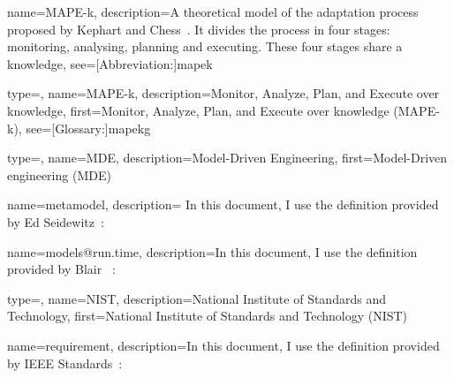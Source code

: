 {
	name={MAPE-k},
    description={A theoretical model of the adaptation process proposed by Kephart and Chess~\cite{DBLP:journals/computer/KephartC03}. It divides the process in four stages: monitoring, analysing, planning and executing. These four stages share a \gls{knowledge}},
    see=[Abbreviation:]{mapek}
}

{
	type=\acronymtype, 
	name={MAPE-k}, 
	description={Monitor, Analyze, Plan, and Execute over knowledge}, 
	first={Monitor, Analyze, Plan, and Execute over knowledge (MAPE-k)}, 
	see=[Glossary:]{mapekg}
}

{
	type=\acronymtype, 
	name={MDE},
	description={Model-Driven Engineering},
	first={Model-Driven engineering (MDE)}
}

{
	name={metamodel},
	description={
In this document, I use the definition provided by Ed Seidewitz~\cite{DBLP:journals/software/Seidewitz03}: }
}

{
	name={models@run.time},
	description={In this document, I use the definition provided by Blair \etal~\cite{DBLP:journals/computer/BlairBF09}: }
}

{
	type=\acronymtype,
	name={NIST},
	description={National Institute of Standards and Technology},
	first={National Institute of Standards and Technology (NIST)}
}


{
	name={requirement},
	description={In this document, I use the definition provided by IEEE Standards~\cite{iso2017systems}: }
}

